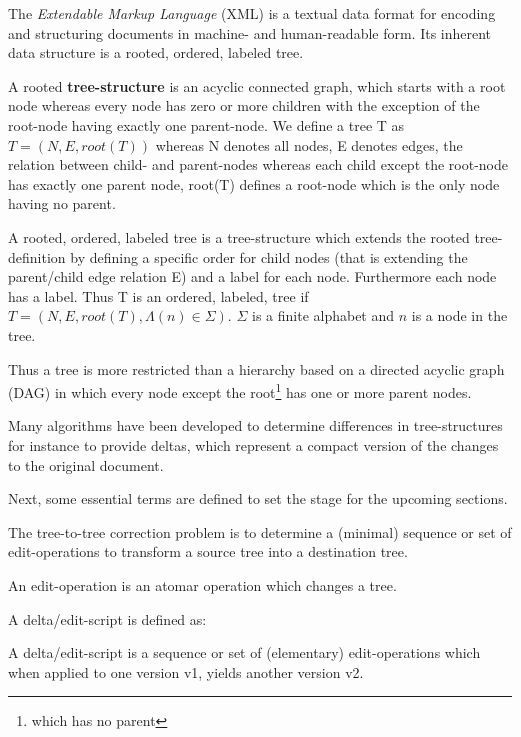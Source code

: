 The \emph{Extendable Markup Language} (XML) is a textual data format for encoding and structuring documents in machine- and human-readable form. Its inherent data structure is a rooted, ordered, labeled tree. 

\begin{mydef}
A rooted \textbf{tree-structure} is an acyclic connected graph, which starts with a root node whereas every node has zero or more children with the exception of the root-node having exactly one parent-node. We define a tree T as $T = (N, E, root(T))$ whereas N denotes all nodes, E denotes edges, the relation between child- and parent-nodes whereas each child except the root-node has exactly one parent node, root(T) defines a root-node which is the only node having no parent.
\end{mydef}

\begin{mydef}
A rooted, ordered, labeled tree is a tree-structure which extends the rooted tree-definition by defining a specific order for child nodes (that is extending the parent/child edge relation E) and a label for each node. Furthermore each node has a label. Thus T is an ordered, labeled, tree if $T = (N, E, root(T), \Lambda(n) \in \Sigma)$. $\Sigma$ is a finite alphabet and $n$ is a node in the tree.
\end{mydef}

Thus a tree is more restricted than a hierarchy based on a directed acyclic graph (DAG) in which every node except the root\footnote{which has no parent} has one or more parent nodes.

Many algorithms have been developed to determine differences in tree-structures for instance to provide deltas, which represent a compact version of the changes to the original document.

Next, some essential terms are defined to set the stage for the upcoming sections.

The tree-to-tree correction problem is to determine a (minimal) sequence or set of edit-operations to transform a source tree into a destination tree. 

\begin{mydef}
An edit-operation is an atomar operation which changes a tree.
\end{mydef}

A delta/edit-script is defined as:

\begin{mydef}
A delta/edit-script is a sequence or set of (elementary) edit-operations which when applied to one version v1, yields another version v2.
\end{mydef}

